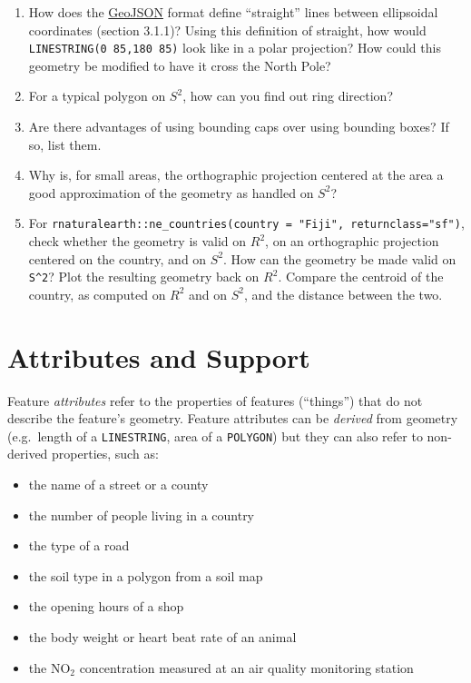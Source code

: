 \documentclass[]{book}
\providecommand{\tightlist}{%
  \setlength{\itemsep}{0pt}\setlength{\parskip}{0pt}}
\begin{document}
\begin{enumerate}
\def\labelenumi{\arabic{enumi}.}
\tightlist
\item
  How does the \href{https://tools.ietf.org/html/rfc7946}{GeoJSON} format define
  ``straight'' lines between ellipsoidal coordinates (section 3.1.1)?
  Using this definition of straight, how would \texttt{LINESTRING(0\ 85,180\ 85)}
  look like in a polar projection? How could this geometry be modified to
  have it cross the North Pole?
\item
  For a typical polygon on \(S^2\), how can you find out ring direction?
\item
  Are there advantages of using bounding caps over using bounding boxes? If so, list them.
\item
  Why is, for small areas, the orthographic projection centered
  at the area a good approximation of the geometry as handled on \(S^2\)?
\item
  For \texttt{rnaturalearth::ne\_countries(country\ =\ "Fiji",\ returnclass="sf")}, check whether the geometry is valid on \(R^2\),
  on an orthographic projection centered on the country, and on \(S^2\).
  How can the geometry be made valid on \texttt{S\^{}2}? Plot the resulting
  geometry back on \(R^2\). Compare the centroid of the country,
  as computed on \(R^2\) and on \(S^2\), and the distance between the two.
\end{enumerate}

\hypertarget{featureattributes}{%
\chapter{Attributes and Support}\label{featureattributes}}

Feature \emph{attributes} refer to the properties of features (``things'')
that do not describe the feature's geometry. Feature attributes can
be \emph{derived} from geometry (e.g.~length of a \texttt{LINESTRING}, area
of a \texttt{POLYGON}) but they can also refer to non-derived properties,
such as:

\begin{itemize}
\tightlist
\item
  the name of a street or a county
\item
  the number of people living in a country
\item
  the type of a road
\item
  the soil type in a polygon from a soil map
\item
  the opening hours of a shop
\item
  the body weight or heart beat rate of an animal
\item
  the NO\(_2\) concentration measured at an air quality monitoring station
\end{itemize}
\end{document}
